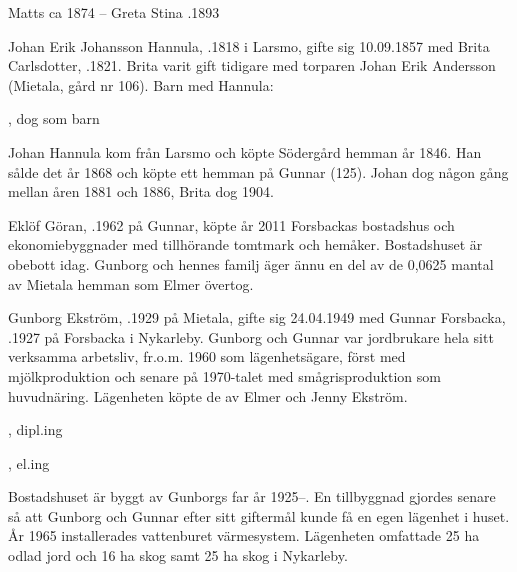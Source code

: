 Matts \textdied ca 1874  --  Greta Stina .1893


Johan Erik Johansson Hannula, .1818 i Larsmo, gifte sig 10.09.1857 med Brita Carlsdotter, .1821. Brita varit gift tidigare med torparen Johan Erik Andersson (Mietala, gård nr 106). Barn med Hannula:
\begin{jhchildren}
  \item {}
  \item {}
  \item {}, dog som barn
  \item {}
\end{jhchildren}
Johan Hannula kom från Larsmo och köpte Södergård hemman år 1846. Han sålde det år 1868 och köpte ett hemman på Gunnar (125). Johan dog någon gång mellan åren 1881 och 1886, Brita dog 1904.





Eklöf Göran, .1962 på Gunnar, köpte år 2011 Forsbackas bostadshus och ekonomiebyggnader med tillhörande tomtmark och hemåker. Bostadshuset är obebott idag. Gunborg och hennes familj äger ännu en del av de 0,0625 mantal av Mietala hemman som Elmer övertog.

Gunborg Ekström, .1929 på Mietala, gifte sig 24.04.1949 med Gunnar Forsbacka, .1927 på Forsbacka i Nykarleby. Gunborg och Gunnar var jordbrukare hela sitt verksamma arbetsliv, fr.o.m. 1960 som lägenhetsägare, först med mjölkproduktion och senare på 1970-talet med smågrisproduktion som huvudnäring. Lägenheten köpte de av Elmer och Jenny Ekström.
\begin{jhchildren}
  \item {}, dipl.ing
  \item {}, el.ing
\end{jhchildren}
Bostadshuset är byggt av Gunborgs far år 1925--. En tillbyggnad gjordes senare så att Gunborg och Gunnar efter sitt
giftermål kunde få en egen lägenhet i huset. År 1965 installerades vattenburet värmesystem. Lägenheten omfattade 25 ha odlad jord och 16 ha skog samt 25 ha skog i Nykarleby.

